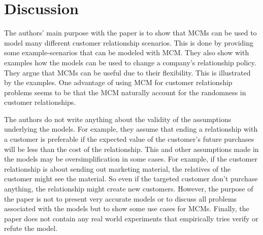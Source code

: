 \documentclass[11pt]{article}
\begin{document}
\section{Discussion}


The authors' main purpose with the paper is to show that MCMs can be used to model many different customer relationship scenarios. 
This is done by providing some example-scenarios that can be modeled with MCM. They also show with examples how the models can be used to change a company's relationship policy. They argue that MCMs can be useful due to their flexibility. This is illustrated by the examples. 
One advantage of using MCM for customer relationship problems seems to be that the MCM naturally account for the randomness  in customer relationships. 

The authors do not write anything about the validity of the assumptions underlying the models. 
For example, they assume that ending a relationship with a customer is preferable if the expected value of the customer's future purchases will be less than the cost of the relationship. 
This and other assumptions made in the models may be oversimplification in some cases. 
For example, if the customer relationship is about sending out marketing material, the relatives of the customer might see the material.
So even if the targeted customer don't purchase anything, the relationship might create new customers. 
However, the purpose of the paper is not to present very accurate models or to discuss all problems associated with the models but to show some use cases for MCMs.
Finally, the paper does not contain any real world experiments that empirically tries verify or refute the model.

\end{document}

